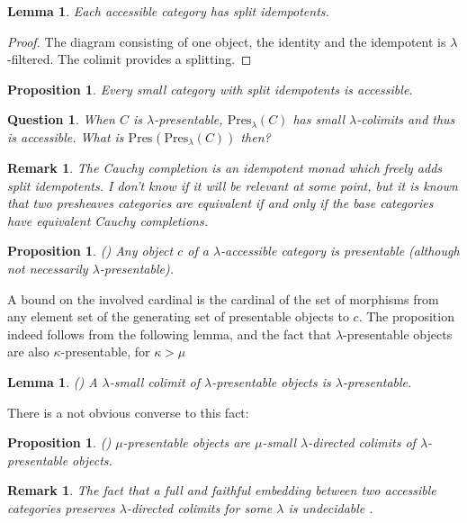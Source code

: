 \documentclass{article}
\newcommand{\Pres}[1]{\text{Pres}_{#1}}
\newtheorem{proposition}[theorem]{Proposition}
\newtheorem{question}[theorem]{Question}
\newtheorem{remark}[theorem]{Remark}
\newtheorem{lemma}[theorem]{Lemma}
\begin{document}
\begin{lemma}
  \cite[2.4]{adamek_rosicky}
  Each accessible category has split idempotents. 
\end{lemma}
\begin{proof}
 The diagram consisting of one object, the identity and the idempotent is
 $\lambda$-filtered. The colimit provides a splitting.
\end{proof}
\begin{proposition}
  \cite[2.6]{adamek_rosicky}
  Every small category with split idempotents is accessible. 
\end{proposition}
\begin{question}
  When $C$ is $\lambda$-presentable,
 $\Pres\lambda(C)$ has small $\lambda$-colimits and thus is accessible.
 What is $\Pres{}(\Pres\lambda(C))$ then?
\end{question}
\begin{remark}
  The Cauchy completion is an idempotent monad which freely adds split idempotents.
  I don't know if it will be relevant at some point, but it is known that
 two presheaves categories are equivalent if and only if the base categories have equivalent
 Cauchy completions.
\end{remark}


\begin{proposition}
  (\cite[Remarks 2.2, (3)]{adamek_rosicky})
  Any object $c$ of a $\lambda$-accessible category is presentable
  (although not necessarily $\lambda$-presentable).
\end{proposition}
A bound on the involved cardinal is the cardinal of the set of morphisms from any
element set of the generating set of presentable objects to $c$.
The proposition indeed follows from the following lemma, and the fact that $\lambda$-presentable
objects are also $\kappa$-presentable, for $\kappa>\mu$
\begin{lemma}
  (\cite[1.16]{adamek_rosicky})
 A $\lambda$-small colimit of $\lambda$-presentable objects is $\lambda$-presentable.
\end{lemma}
There is a not obvious converse to this fact:
\begin{proposition}
  (\cite[Proposition 2.3.11]{accessible})
  $\mu$-presentable objects are $\mu$-small $\lambda$-directed colimits of
  $\lambda$-presentable objects.
\end{proposition}
\begin{remark}
 The fact that a full and faithful embedding between two accessible categories preserves
 $\lambda$-directed colimits for some $\lambda$ is undecidable \cite[2.17.(3)]{adamek_rosicky}.
\end{remark}
\end{document}
